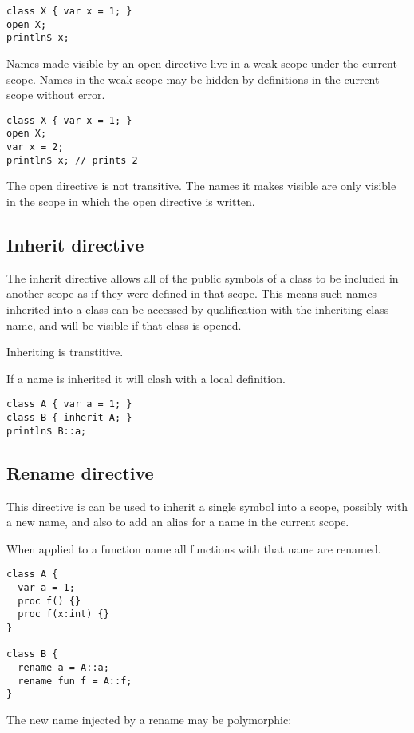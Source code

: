 \documentclass[oneside]{book}
\begin{document}
\begin{verbatim}
class X { var x = 1; }
open X;
println$ x;
\end{verbatim}


Names made visible by an open directive
live in a weak scope under the current scope.
Names in the weak scope may be hidden by definitions
in the current scope without error.

\begin{verbatim}
class X { var x = 1; }
open X;
var x = 2;
println$ x; // prints 2
\end{verbatim}


The open directive is not transitive.
The names it makes visible are only visible
in the scope in which the open directive is written.

\subsection{Inherit directive}
The inherit directive allows all of the public symbols
of a class to be included in another scope as if they
were defined in that scope. This means such names
inherited into a class can be accessed by qualification
with the inheriting class name, and will be visible
if that class is opened. 

Inheriting is transtitive.

If a name is inherited it will clash with a local definition.

\begin{verbatim}
class A { var a = 1; }
class B { inherit A; }
println$ B::a;
\end{verbatim}


\subsection{Rename directive}
This directive is can be used to inherit a single
symbol into a scope, possibly with a new name,
and also to add an alias for a name in the current
scope.

When applied to a function name all functions with
that name are renamed.


\begin{verbatim}
class A { 
  var a = 1; 
  proc f() {} 
  proc f(x:int) {} 
}

class B { 
  rename a = A::a;
  rename fun f = A::f;
}
\end{verbatim}

The new name injected by a rename may be polymorphic:
\end{document}
